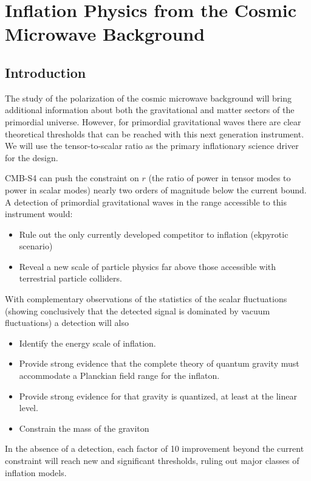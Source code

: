  
\chapter{Inflation Physics from the Cosmic Microwave Background}
\renewcommand*\thesection{\arabic{section}}

\def\gtrsim{\raise-.75ex\hbox{$\buildrel>\over\sim$}}

\section{Introduction}
The study of the polarization of the cosmic microwave background will bring additional information about both the gravitational and matter sectors of the primordial universe. However, for primordial gravitational waves there are clear theoretical thresholds that can be reached with this next generation instrument. We will use the tensor-to-scalar ratio as the primary inflationary science driver for the design.

CMB-S4 can push the constraint on $r$ (the ratio of power in tensor modes to power in scalar modes) nearly two orders of magnitude below the current bound.  A detection of primordial gravitational waves in the range accessible to this instrument would:
\begin{itemize}
\item  Rule out the only currently developed competitor to inflation (ekpyrotic scenario)
 \item Reveal a new scale of particle physics far above those accessible with terrestrial particle colliders.  
\end{itemize}
With complementary observations of the statistics of the scalar fluctuations (showing conclusively that the detected signal is dominated by vacuum fluctuations) a detection will also
\begin{itemize}
 \item Identify the energy scale of inflation. 
 \item Provide strong evidence that the complete theory of quantum gravity must accommodate a Planckian field range for the inflaton.
 \item Provide strong evidence for that gravity is quantized, at least at the linear level.
\item  Constrain the mass of the graviton
\end{itemize}
In the absence of a detection, each factor of 10 improvement beyond the current constraint will reach new and significant thresholds, ruling out major classes of inflation models. 

